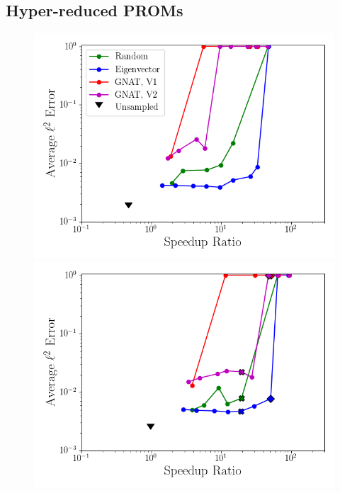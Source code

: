 \subsection{Hyper-reduced PROMs}

\begin{figure}
	\begin{minipage}{0.49\linewidth}
		\includegraphics[width=0.99\linewidth]{Chapters/CavityAndCVRC/Images/cavity/deim/sampled_dt2p5e-6_Average_errorRaw_pareto.png}
		\subcaption{$\dt = 2.5 \times \dtFOM$}
	\end{minipage}
	\begin{minipage}{0.49\linewidth}
		\includegraphics[width=0.99\linewidth]{Chapters/CavityAndCVRC/Images/cavity/deim/sampled_dt5e-6_Average_errorRaw_pareto.png}
		\subcaption{$\dt = 5 \times \dtFOM$}
	\end{minipage}


\end{figure}

